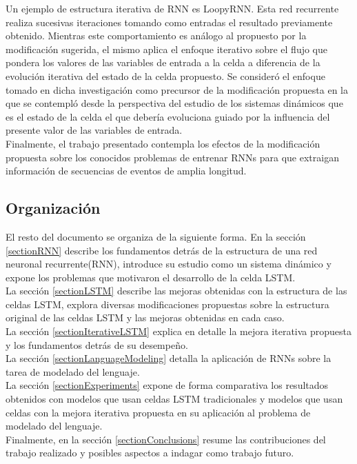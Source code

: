 \documentclass{article}
\begin{document}
	Un ejemplo de estructura iterativa de RNN es LoopyRNN\cite{17LoopyRNN}. Esta red recurrente realiza sucesivas iteraciones tomando como entradas el resultado previamente obtenido. Mientras este comportamiento es análogo al propuesto por la modificación sugerida, el mismo aplica el enfoque iterativo sobre el flujo que pondera los valores de las variables de entrada a la celda a diferencia de la evolución iterativa del estado de la celda propuesto. Se consideró el enfoque tomado en dicha investigación como precursor de la modificación propuesta en la que se contempló desde la perspectiva del estudio de los sistemas dinámicos que es el estado de la celda el que debería evoluciona guiado por la influencia del presente valor de las variables de entrada.\\
	Finalmente, el trabajo presentado contempla los efectos de la modificación propuesta sobre los conocidos problemas de entrenar RNNs para que extraigan información de secuencias de eventos de amplia longitud.
	
	\subsection{Organización}
	El resto del documento se organiza de la siguiente forma. 
	En la sección \ref{sectionRNN} describe los fundamentos detrás de la estructura de una red neuronal recurrente(RNN), introduce su estudio como un sistema dinámico y expone los problemas que motivaron el desarrollo de la celda LSTM. \\
	La sección \ref{sectionLSTM} describe las mejoras obtenidas con la estructura de las celdas LSTM, explora diversas modificaciones propuestas sobre la estructura original de las celdas LSTM y las mejoras obtenidas en cada caso. \\
	La sección \ref{sectionIterativeLSTM} explica en detalle la mejora iterativa propuesta y los fundamentos detrás de su desempeño.\\
	La sección \ref{sectionLanguageModeling} detalla la aplicación de RNNs sobre la tarea de modelado del lenguaje.\\
	La sección \ref{sectionExperiments} expone de forma comparativa los resultados obtenidos con modelos que usan celdas LSTM tradicionales y modelos que usan celdas con la mejora iterativa propuesta en su aplicación al problema de modelado del lenguaje. \\
	Finalmente, en la sección \ref{sectionConclusions} resume las contribuciones del trabajo realizado y posibles aspectos a indagar como trabajo futuro.
	
\end{document}
